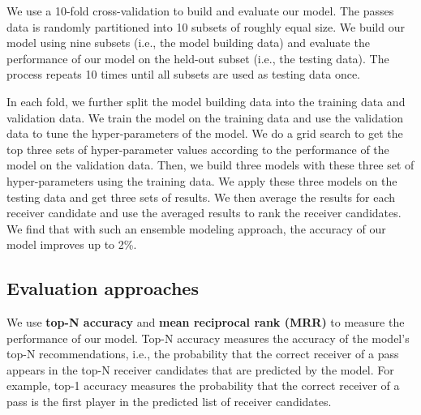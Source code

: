 We use a 10-fold cross-validation to build and evaluate our model. 
The passes data is randomly partitioned into 10 subsets of roughly equal size. 
We build our model using nine subsets (i.e., the model building data) and evaluate the performance of our model on the held-out subset (i.e., the testing data).
The process repeats 10 times until all subsets are used as testing data once.

In each fold, we further split the model building data into the training data and validation data.
We train the model on the training data and use the validation data to tune the hyper-parameters of the model. %
We do a grid search to get the top three sets of hyper-parameter values according to the performance of the model on the validation data.
Then, we build three models with these three set of hyper-parameters using the training data. 
We apply these three models on the testing data and get three sets of results.
We then average the results for each receiver candidate and use the averaged results to rank the receiver candidates. We find that with such an ensemble modeling approach, the accuracy of our model improves up to 2\%.%




\subsection{Evaluation approaches}\label{evaluation-approach}

We use \textbf{top-N accuracy} and \textbf{mean reciprocal rank (MRR)} to measure the performance of our model.
Top-N accuracy measures the accuracy of the model's top-N recommendations, i.e., the probability that the correct receiver of a pass appears in the top-N receiver candidates that are predicted by the model.
For example, top-1 accuracy measures the probability that the correct receiver of a pass is the first player in the predicted list of receiver candidates.

